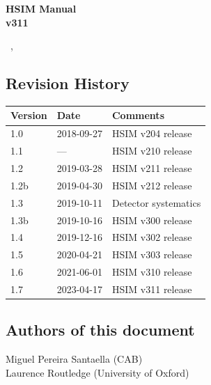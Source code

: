 \documentclass[12pt]{report}
\def\mydate{\leavevmode\hbox{\the\day~\monthname, \the\year}}
\begin{document}
\begin{titlepage}

\vspace*{4cm}
\begin{center}

{\selectfont
\Huge
\textbf{
HSIM Manual\\[0.5ex]
\Large
v311}
\vspace{2cm}

\large
\mydate
}
\end{center}
\vspace*{\fill}


\end{titlepage}

\tableofcontents

\vfill
\subsection*{Revision History}

\begin{table}[h]
\label{tab:revision}
\begin{tabular}{lll}
\hline
Version & Date & Comments \\
\hline
1.0 & 2018-09-27 & HSIM v204 release \\
1.1 & --- & HSIM v210 release \\
1.2 & 2019-03-28 & HSIM v211 release \\
1.2b & 2019-04-30 & HSIM v212 release \\
1.3 & 2019-10-11 & Detector systematics \\
1.3b & 2019-10-16 & HSIM v300 release \\
1.4 & 2019-12-16 & HSIM v302 release \\
1.5 & 2020-04-21 & HSIM v303 release \\
1.6 & 2021-06-01 & HSIM v310 release \\
1.7 & 2023-04-17 & HSIM v311 release \\
\hline
\end{tabular}
\end{table}


\subsection*{Authors of this document}
Miguel Pereira Santaella (CAB) \\
Laurence Routledge (University of Oxford)

\clearpage
\end{document}
